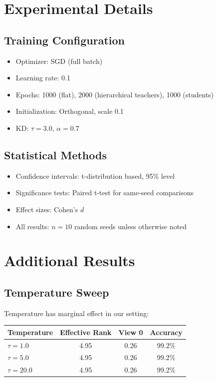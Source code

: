 \documentclass{article}
\begin{document}
\section{Experimental Details}
\label{app:details}

\subsection{Training Configuration}
\begin{itemize}
    \item Optimizer: SGD (full batch)
    \item Learning rate: 0.1
    \item Epochs: 1000 (flat), 2000 (hierarchical teachers), 1000 (students)
    \item Initialization: Orthogonal, scale 0.1
    \item KD: $\tau = 3.0$, $\alpha = 0.7$
\end{itemize}

\subsection{Statistical Methods}
\begin{itemize}
    \item Confidence intervals: t-distribution based, 95\% level
    \item Significance tests: Paired t-test for same-seed comparisons
    \item Effect sizes: Cohen's $d$
    \item All results: $n = 10$ random seeds unless otherwise noted
\end{itemize}

\section{Additional Results}
\label{app:results}

\subsection{Temperature Sweep}
Temperature has marginal effect in our setting:

\begin{table}[h]
\centering
\begin{tabular}{@{}lccc@{}}
\toprule
Temperature & Effective Rank & View 0 & Accuracy \\
\midrule
$\tau = 1.0$ & 4.95 & 0.26 & 99.2\% \\
$\tau = 5.0$ & 4.95 & 0.26 & 99.2\% \\
$\tau = 20.0$ & 4.95 & 0.26 & 99.2\% \\
\bottomrule
\end{tabular}
\end{table}
\end{document}
